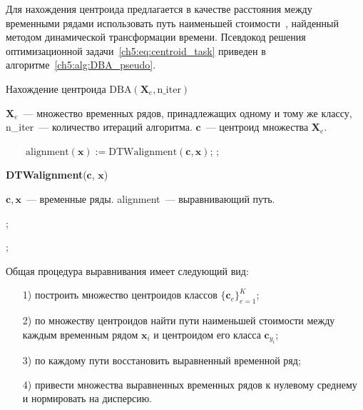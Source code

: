 Для нахождения центроида предлагается в качестве расстояния между временными рядами использовать путь наименьшей стоимости~\cite{berndt1994using,muller2007dynamic}, найденный методом динамической трансформации времени.
Псевдокод решения оптимизационной задачи~\eqref{ch5:eq:centroid_task} приведен в алгоритме~\ref{ch5:alg:DBA_pseudo}.
\begin{algorithm}[!t]
	\caption{Нахождение центроида $\text{DBA}(\mathbf{X}_e, \text{n\_iter})$}
	\label{ch5:alg:DBA_pseudo}
	\begin{algorithmic}[1]
		\REQUIRE $\mathbf{X}_e$~--- множество временных рядов, принадлежащих одному и тому же классу, n\_iter~--- количество итераций алгоритма.
		\ENSURE $\mathbf{c}$~--- центроид множества $\mathbf{X}_e$.
		
		\STATEx $ \quad \quad \text{alignment}(\mathbf{x}) := \text{DTWalignment}(\mathbf{c}, \mathbf{x})$;
		\ENDFOR
		;
		\ENDFOR
	\end{algorithmic}

	\textbf{DTWalignment}($\mathbf{c}$, $\mathbf{x}$)
	\begin{algorithmic}[1]
		\REQUIRE $\mathbf{c}, \mathbf{x}$~--- временные ряды.
		\ENSURE alignment~--- выравнивающий путь.
		
		;
		
		;
	\end{algorithmic}
\end{algorithm}
Общая процедура выравнивания имеет следующий вид:
\begin{itemize}
	\item[1)]
	построить множество центроидов классов $\{\mathbf{c}_e\}_{e = 1}^K$;
	\item[2)]
	по множеству центроидов найти пути наименьшей стоимости между каждым
	временным рядом $\mathbf{x}_i$ и центроидом его класса $\mathbf{c}_{y_i}$;
	\item[3)]
	по каждому пути восстановить выравненный временной ряд;
	\item[4)]
	привести множества выравненных временных рядов к нулевому среднему и нормировать на дисперсию.
\end{itemize}

